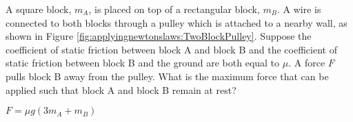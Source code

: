 \question A square block, $m_A$, is placed on top of a rectangular block, $m_B$. A wire is connected to both blocks through a pulley which is attached to a nearby wall, as shown in Figure \ref{fig:applyingnewtonslaws:TwoBlockPulley}. Suppose the coefficient of static friction between block A and block B and the coefficient of static friction between block B and the ground are both equal to $\mu$. A force $F$ pulls block B away from the pulley. What is the maximum force that can be applied such that block A and block B remain at rest?


\begin{finalanswer}
$F=\mu g(3m_A+m_B)$
\end{finalanswer}

